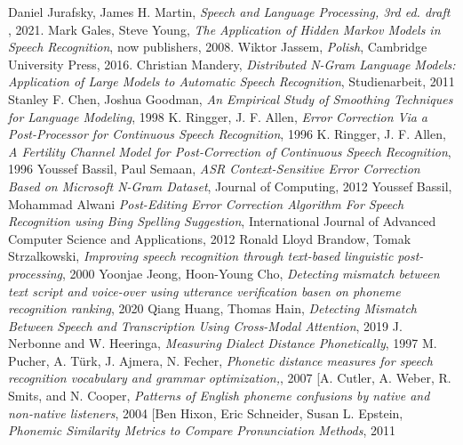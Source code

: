 \documentclass[a4paper,11pt,twoside]{report}
\theoremstyle{definition}
\begin{document}

\begin{thebibliography}{20}%

 Daniel Jurafsky, James H. Martin, \emph{Speech and Language Processing, 3rd ed. draft }, 2021.
 Mark Gales, Steve Young, \emph{The Application of Hidden Markov Models in Speech Recognition}, now publishers, 2008.
 Wiktor Jassem, \emph{Polish}, Cambridge University Press, 2016.
 Christian Mandery, \emph{Distributed N-Gram Language Models: Application of Large Models to Automatic Speech Recognition}, Studienarbeit, 2011
 Stanley F. Chen, Joshua Goodman, \emph{An Empirical Study of Smoothing Techniques for Language Modeling}, 1998
 K. Ringger, J. F. Allen, \emph{Error Correction Via a Post-Processor for Continuous Speech Recognition}, 1996
 K. Ringger, J. F. Allen, \emph{A Fertility Channel Model for Post‐Correction of Continuous Speech Recognition}, 1996
 Youssef Bassil, Paul Semaan, \emph {ASR Context-Sensitive Error Correction Based on Microsoft N-Gram Dataset}, Journal of Computing, 2012
 Youssef Bassil, Mohammad Alwani \emph {Post-Editing Error Correction Algorithm For Speech Recognition using Bing Spelling Suggestion}, International Journal of Advanced Computer Science and Applications, 2012
 Ronald Lloyd Brandow, Tomak Strzalkowski, \emph{Improving speech recognition through text-based linguistic post-processing}, 2000
 Yoonjae Jeong, Hoon-Young Cho, \emph{Detecting mismatch between text script and voice-over using utterance verification basen on phoneme recognition ranking}, 2020
 Qiang Huang, Thomas Hain, \emph{Detecting Mismatch Between Speech and Transcription Using Cross-Modal Attention}, 2019
 J. Nerbonne and W. Heeringa, \emph{Measuring Dialect Distance Phonetically}, 1997
 M. Pucher, A. Türk, J. Ajmera, N. Fecher, \emph{Phonetic distance measures for speech recognition vocabulary and
grammar optimization,}, 2007
  [A. Cutler, A. Weber, R. Smits, and N. Cooper, \emph{Patterns of English phoneme confusions by native and non-native listeners}, 2004
  [Ben Hixon, Eric Schneider, Susan L. Epstein, \emph{Phonemic Similarity Metrics to Compare Pronunciation Methods}, 2011



\end{thebibliography}
\end{document}

